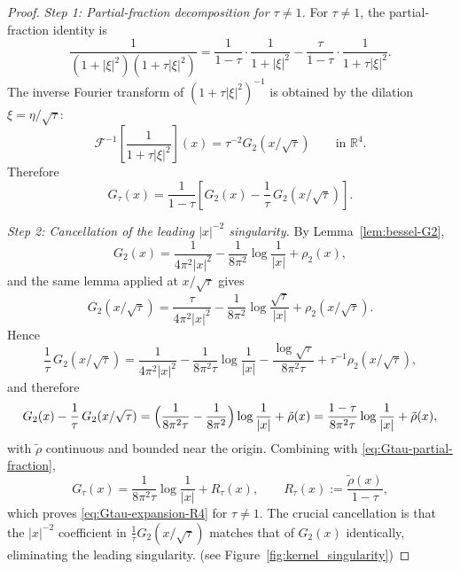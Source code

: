 \documentclass[11pt,reqno]{amsart}
\theoremstyle{definition}
\theoremstyle{remark}
\newcommand{\R}{\mathbb{R}}
\begin{document}
\begin{proof}
\emph{Step 1: Partial-fraction decomposition for $\tau\ne 1$.}
For $\tau\ne 1$, the partial-fraction identity is
\begin{equation}\label{eq:partial-fractions}
        \frac{1}{(1+|\xi|^{2})(1+\tau|\xi|^{2})}
        =\frac{1}{1-\tau}\cdot\frac{1}{1+|\xi|^{2}}
        -\frac{\tau}{1-\tau}\cdot\frac{1}{1+\tau|\xi|^{2}}.
\end{equation}
The inverse Fourier transform of $(1+\tau|\xi|^{2})^{-1}$ is obtained by the dilation $\xi=\eta/\sqrt{\tau}$:
\[
        \mathcal{F}^{-1}\!\left[\frac{1}{1+\tau|\xi|^{2}}\right]\!(x)
        =\tau^{-2}G_2(x/\sqrt{\tau})\qquad\text{in }\R^{4}.
\]
Therefore
\begin{equation}\label{eq:Gtau-partial-fraction}
        G_\tau(x)=\frac{1}{1-\tau}\!\left[G_2(x)-\frac{1}{\tau}\,G_2(x/\sqrt{\tau})\right].
\end{equation}

\emph{Step 2: Cancellation of the leading $|x|^{-2}$ singularity.}
By Lemma~\ref{lem:bessel-G2},
\[
        G_2(x)=\frac{1}{4\pi^{2}|x|^{2}}-\frac{1}{8\pi^{2}}\log\frac{1}{|x|}+\rho_2(x),
\]
and the same lemma applied at $x/\sqrt{\tau}$ gives
\[
        G_2(x/\sqrt{\tau})
        =\frac{\tau}{4\pi^{2}|x|^{2}}-\frac{1}{8\pi^{2}}\log\frac{\sqrt{\tau}}{|x|}+\rho_2(x/\sqrt{\tau}).
\]
Hence
\[
        \frac{1}{\tau}\,G_2(x/\sqrt{\tau})
        =\frac{1}{4\pi^{2}|x|^{2}}
        -\frac{1}{8\pi^{2}\tau}\log\frac{1}{|x|}
        -\frac{\log\sqrt{\tau}}{8\pi^{2}\tau}
        +\tau^{-1}\rho_2(x/\sqrt{\tau}),
\]
and therefore
\[
        G_2(x)-\frac{1}{\tau}\,G_2(x/\sqrt{\tau})
        =\Bigl(\frac{1}{8\pi^{2}\tau}-\frac{1}{8\pi^{2}}\Bigr)\log\frac{1}{|x|}+\tilde\rho(x)
        =\frac{1-\tau}{8\pi^{2}\tau}\log\frac{1}{|x|}+\tilde\rho(x),
\]
with $\tilde\rho$ continuous and bounded near the origin. Combining with \eqref{eq:Gtau-partial-fraction},
\[
        G_\tau(x)=\frac{1}{8\pi^{2}\tau}\log\frac{1}{|x|}+R_\tau(x),
        \qquad R_\tau(x):=\frac{\tilde\rho(x)}{1-\tau},
\]
which proves \eqref{eq:Gtau-expansion-R4} for $\tau\ne 1$. The crucial cancellation is that the $|x|^{-2}$ coefficient in $\frac{1}{\tau}G_2(x/\sqrt{\tau})$ matches that of $G_2(x)$ identically, eliminating the leading singularity. (see Figure~\ref{fig:kernel_singularity})


\end{proof}
\end{document}
